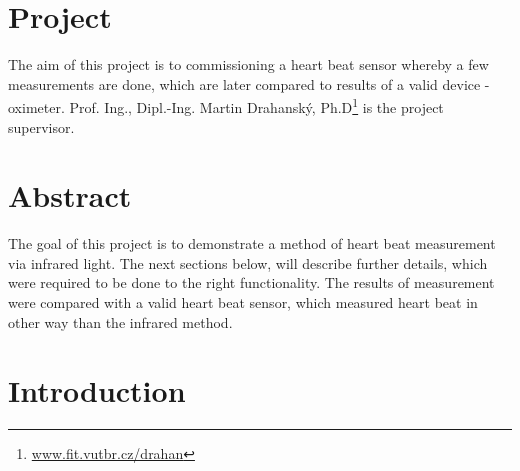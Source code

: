 \documentclass[11pt,a4paper]{article}
\newcommand{\tilda}{\raisebox{0.5ex}{\texttildelow}}
\begin{document}


\setlength{\parskip}{0pt}
\hypersetup{hidelinks}\tableofcontents
\setlength{\parskip}{0pt}

\newpage

\section{Project}

The aim of this project is to commissioning a heart beat sensor whereby a few measurements are done, which are later compared to results of a valid device - oximeter. Prof. Ing., Dipl.-Ing. Martin Drahanský, Ph.D\footnote{\href{http://www.fit.vutbr.cz/~drahan/}{www.fit.vutbr.cz/{\tilda}drahan}} is the project supervisor.

\section{Abstract}

The goal of this project is to demonstrate a method of heart beat measurement via infrared light. The next sections below, will describe further details, which were required to be done to the right functionality. The results of measurement were compared with a valid heart beat sensor, which measured heart beat in other way than the infrared method.

\section{Introduction}
\end{document}
